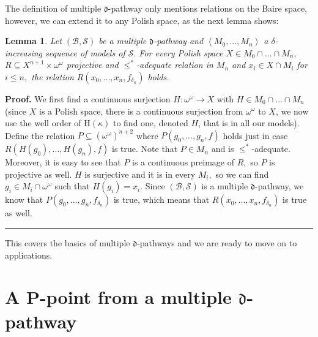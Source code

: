 \documentclass{article}%
\newtheorem{lemma}[theorem]{Lemma}
\newenvironment{proof}[1][Proof]{\noindent\textbf{#1.} }{\ \rule{0.5em}{0.5em}}
\begin{document}
\qquad\qquad\qquad\qquad

The definition of multiple $\mathfrak{d}$-pathway only mentions relations on
the Baire space, however, we can extend it to any Polish space, as the next
lemma shows:

\begin{lemma}
Let $\left(  \mathcal{B},\mathcal{S}\right)  $ be a multiple $\mathfrak{d}%
$-pathway and $\left\langle M_{0},...,M_{n}\right\rangle $ a $\delta
$-increasing sequence of models of $\mathcal{S}.$ For every Polish space $X\in
M_{0}\cap...\cap M_{n},$ $R\subseteq X^{n+1}\times\omega^{\omega}$ projective
and $\leq^{\ast}$-adequate relation in $M_{n}$ and $x_{i}\in X\cap M_{i}$ for
$i\leq n,$ the relation $R\left(  x_{0},...,x_{n},f_{\delta_{n}}\right)  $ holds.
\end{lemma}

\begin{proof}
We first find a continuous surjection $H:\omega^{\omega}\longrightarrow X$
with $H\in M_{0}\cap...\cap M_{n}$ (since $X$ is a Polish space, there is a
continuous surjection from $\omega^{\omega}$ to $X$, we now use the well order
of \textsf{H}$\left(  \kappa\right)  $ to find one, denoted $H$, that is in
all our models). Define the relation $P\subseteq\left(  \omega^{\omega
}\right)  ^{n+2}$ where $P\left(  g_{0},...,g_{n},f\right)  $ holds just in
case $R\left(  H\left(  g_{0}\right)  ,...,H\left(  g_{n}\right)  ,f\right)  $
is true. Note that $P\in M_{n}$ and is $\leq^{\ast}$-adequate. Moreover, it is
easy to see that $P$ is a continuous preimage of $R,$ so $P$ is projective as
well. $H$ is surjective and it is in every $M_{i},$ so we can find $g_{i}\in
M_{i}\cap\omega^{\omega}$ such that $H\left(  g_{i}\right)  =x_{i}.$ Since
$\left(  \mathcal{B},\mathcal{S}\right)  $ is a multiple $\mathfrak{d}%
$-pathway, we know that $P\left(  g_{0},...,g_{n},f_{\delta_{n}}\right)  $ is
true, which means that $R\left(  x_{0},...,x_{n},f_{\delta_{n}}\right)  $ is
true as well.
\end{proof}

\qquad\qquad

This covers the basics of multiple $\mathfrak{d}$-pathways and we are ready to
move on to applications.

\section{A P-point from a multiple $\mathfrak{d}$-pathway \label{Ppoint}}
\end{document}
